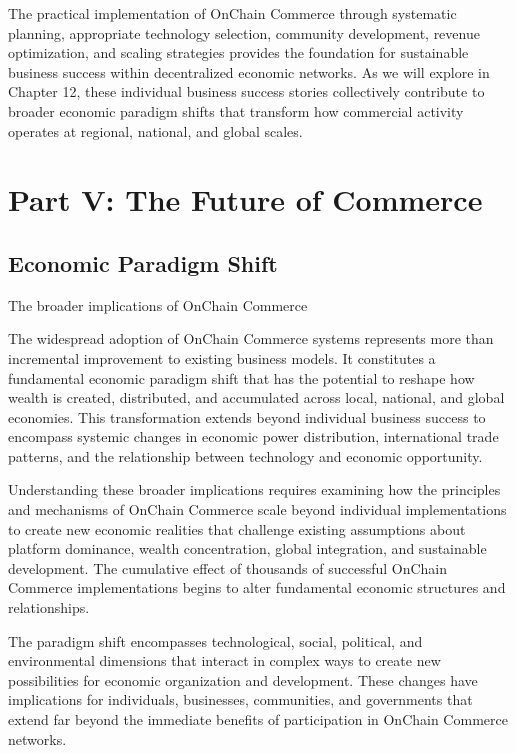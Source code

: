 \documentclass[
  Letterpaper,
]{scrbook}
\begin{document}
The practical implementation of OnChain Commerce through systematic
planning, appropriate technology selection, community development,
revenue optimization, and scaling strategies provides the foundation for
sustainable business success within decentralized economic networks. As
we will explore in Chapter 12, these individual business success stories
collectively contribute to broader economic paradigm shifts that
transform how commercial activity operates at regional, national, and
global scales.

\part{Part V: The Future of Commerce}

\chapter{Economic Paradigm Shift}\label{sec-paradigm-shift}

The broader implications of OnChain Commerce

The widespread adoption of OnChain Commerce systems represents more than
incremental improvement to existing business models. It constitutes a
fundamental economic paradigm shift that has the potential to reshape
how wealth is created, distributed, and accumulated across local,
national, and global economies. This transformation extends beyond
individual business success to encompass systemic changes in economic
power distribution, international trade patterns, and the relationship
between technology and economic opportunity.

Understanding these broader implications requires examining how the
principles and mechanisms of OnChain Commerce scale beyond individual
implementations to create new economic realities that challenge existing
assumptions about platform dominance, wealth concentration, global
integration, and sustainable development. The cumulative effect of
thousands of successful OnChain Commerce implementations begins to alter
fundamental economic structures and relationships.

The paradigm shift encompasses technological, social, political, and
environmental dimensions that interact in complex ways to create new
possibilities for economic organization and development. These changes
have implications for individuals, businesses, communities, and
governments that extend far beyond the immediate benefits of
participation in OnChain Commerce networks.
\end{document}

